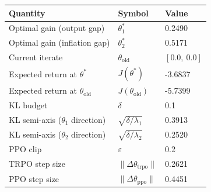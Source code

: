 \begin{tabular}{lll}
\toprule
Quantity & Symbol & Value \\
\midrule
Optimal gain (output gap) & $\theta_1^*$ & 0.2490 \\
Optimal gain (inflation gap) & $\theta_2^*$ & 0.5171 \\
Current iterate & $\theta_{\mathrm{old}}$ & $[0.0,\ 0.0]$ \\
Expected return at $\theta^*$ & $J(\theta^*)$ & -3.6837 \\
Expected return at $\theta_{\mathrm{old}}$ & $J(\theta_{\mathrm{old}})$ & -5.7399 \\
KL budget & $\delta$ & 0.1 \\
KL semi-axis ($\theta_1$ direction) & $\sqrt{\delta/\lambda_1}$ & 0.3913 \\
KL semi-axis ($\theta_2$ direction) & $\sqrt{\delta/\lambda_2}$ & 0.2520 \\
PPO clip & $\varepsilon$ & 0.2 \\
TRPO step size & $\|\Delta\theta_{\mathrm{trpo}}\|$ & 0.2621 \\
PPO step size & $\|\Delta\theta_{\mathrm{ppo}}\|$ & 0.4451 \\
\bottomrule
\end{tabular}
